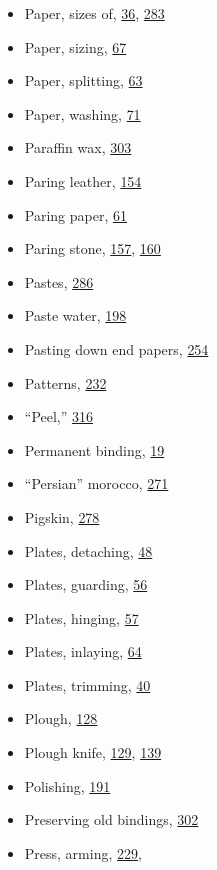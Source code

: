 \documentclass[
]{article}
\begin{document}
\begin{itemize}
\item
  Paper, sizes of, \protect\hyperlink{Page_36}{36},
  \protect\hyperlink{Page_283}{283}
\item
  Paper, sizing, \protect\hyperlink{Page_67}{67}
\item
  Paper, splitting, \protect\hyperlink{Page_63}{63}
\item
  Paper, washing, \protect\hyperlink{Page_71}{71}
\item
  Paraffin wax, \protect\hyperlink{Page_303}{303}
\item
  Paring leather, \protect\hyperlink{Page_154}{154}
\item
  Paring paper, \protect\hyperlink{Page_61}{61}
\item
  Paring stone, \protect\hyperlink{Page_157}{157},
  \protect\hyperlink{Page_160}{160}
\item
  Pastes, \protect\hyperlink{Page_286}{286}
\item
  Paste water, \protect\hyperlink{Page_198}{198}
\item
  Pasting down end papers, \protect\hyperlink{Page_254}{254}
\item
  Patterns, \protect\hyperlink{Page_232}{232}
\item
  ``Peel,'' \protect\hyperlink{Page_316}{316}
\item
  Permanent binding, \protect\hyperlink{Page_19}{19}
\item
  ``Persian'' morocco, \protect\hyperlink{Page_271}{271}
\item
  Pigskin, \protect\hyperlink{Page_278}{278}
\item
  Plates, detaching, \protect\hyperlink{Page_48}{48}
\item
  Plates, guarding, \protect\hyperlink{Page_56}{56}
\item
  Plates, hinging, \protect\hyperlink{Page_57}{57}
\item
  Plates, inlaying, \protect\hyperlink{Page_64}{64}
\item
  Plates, trimming, \protect\hyperlink{Page_40}{40}
\item
  Plough, \protect\hyperlink{Page_128}{128}
\item
  Plough knife, \protect\hyperlink{Page_129}{129},
  \protect\hyperlink{Page_139}{139}
\item
  Polishing, \protect\hyperlink{Page_191}{191}
\item
  Preserving old bindings, \protect\hyperlink{Page_302}{302}
\item
  Press, arming, \protect\hyperlink{Page_229}{229},

\end{itemize}
\end{document}
